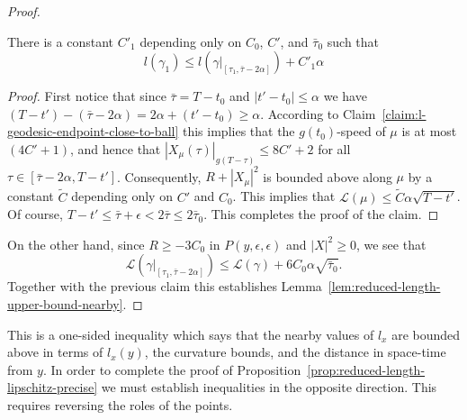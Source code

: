 \begin{proof}
\begin{claim}\label{claim:l-length-concatenation-bound}
There is a constant $C'_1$ depending only on
$C_0$, $C'$, and $\bar\tau_0$ such that
$$l(\gamma_1)\le l(\gamma|_{[\tau_1,\bar\tau-2\alpha]})+C'_1\alpha$$
\end{claim}

\begin{proof}
First notice that since $\bar\tau=T-t_0$ and $|t'-t_0|\le \alpha$ we have
$(T-t')-(\bar\tau-2\alpha)=2\alpha+(t'-t_0)\ge \alpha$. According to
Claim~\ref{claim:l-geodesic-endpoint-close-to-ball} this implies that the $g(t_0)$-speed of $\mu$ is at most
$(4C'+1)$, and hence  that $|X_{\mu}(\tau)|_{g(T-\tau)}\le 8C'+2$ for all
$\tau\in [\bar\tau-2\alpha,T-t']$. Consequently, $R+|X_\mu|^2$ is bounded above
along $\mu$ by a constant $\widetilde C$ depending only on $C'$ and $C_0$. This
implies that ${\mathcal L}(\mu)\le \widetilde C\alpha\sqrt{T-t'}$. Of course,
$T-t'\le \bar\tau+\epsilon<2\bar\tau\le 2\bar\tau_0$. This completes the proof
of the claim.
\end{proof}



On the other hand, since $R\ge -3C_0$ in $P(y,\epsilon,\epsilon)$
and $|X|^2\ge 0$, we see that
$${\mathcal L}(\gamma|_{[\tau_1,\bar\tau-2\alpha]})\le {\mathcal L}(\gamma)
+ 6C_0\alpha\sqrt{\bar\tau_0}.$$  Together with the previous claim
this establishes Lemma~\ref{lem:reduced-length-upper-bound-nearby}.
\end{proof}

This is a one-sided inequality which says that the nearby values of
$l_x$ are bounded above in terms of  $l_x(y)$, the curvature bounds,
and the distance in space-time from $y$. In order to complete the
proof of Proposition~\ref{prop:reduced-length-lipschitz-precise} we must establish inequalities in
the opposite direction. This requires reversing the roles of the
points.


